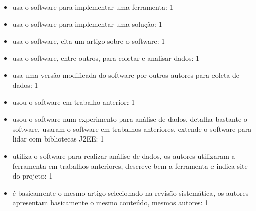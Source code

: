 \begin{itemize}
\item usa o software para implementar uma ferramenta: 1
\item usa o software para implementar uma solução: 1
\item usa o software, cita um artigo sobre o software: 1
\item usa o software, entre outros, para coletar e analisar dados: 1
\item usa uma versão modificada do software por outros autores para coleta de dados: 1
\item usou o software em trabalho anterior: 1
\item usou o software num experimento para análise de dados, detalha bastante o software, usaram o software em trabalhos anteriores, extende o software para lidar com bibliotecas J2EE: 1
\item utiliza o software para realizar análise de dados, os autores utilizaram a ferramenta em trabalhos anteriores, descreve bem a ferramenta e indica site do projeto: 1
\item é basicamente o mesmo artigo selecionado na revisão sistemática, os autores apresentam basicamente o mesmo conteúdo, mesmos autores: 1
\end{itemize}

